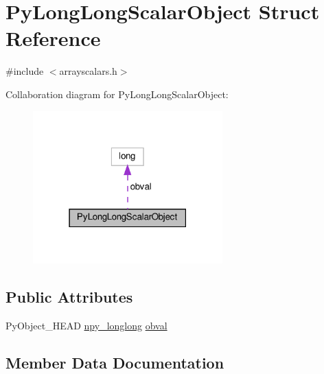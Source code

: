 \hypertarget{structPyLongLongScalarObject}{}\section{Py\+Long\+Long\+Scalar\+Object Struct Reference}
\label{structPyLongLongScalarObject}


{\ttfamily \#include $<$arrayscalars.\+h$>$}



Collaboration diagram for Py\+Long\+Long\+Scalar\+Object\+:
\nopagebreak
\begin{figure}[H]
\begin{center}
\leavevmode
\includegraphics[width=207pt]{structPyLongLongScalarObject__coll__graph}
\end{center}
\end{figure}
\subsection*{Public Attributes}
\begin{DoxyCompactItemize}
\item 
Py\+Object\+\_\+\+H\+E\+AD \hyperlink{npy__common_8h_a76415457b972c826fabd23b1295a000b}{npy\+\_\+longlong} \hyperlink{structPyLongLongScalarObject_a019fab57ecf553654c7f5465a88bce91}{obval}
\end{DoxyCompactItemize}


\subsection{Member Data Documentation}
\mbox{\label{structPyLongLongScalarObject_a019fab57ecf553654c7f5465a88bce91}} 
